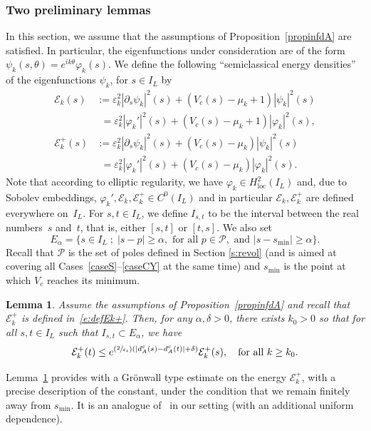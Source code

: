 \documentclass[JEP,XML,SOM,Unicode]{cedram}
\newcommand{\Psfrac}[2]{(\sfrac{#1}{#2})}
\newcommand{\sep}{\;;\;}
\newtheorem{lemma}{Lemma}[section]
\theoremstyle{definition}
\newcommand{\Ek}{\mathcal{E}_k}
\newcommand{\loc}{\mathrm{loc}}
\newcommand{\ce}{c}
\let\d\partial
\let\e\varepsilon
\let\eps\varepsilon
\begin{document}
\subsubsection{Two preliminary lemmas}
In this section, we assume that the assumptions of Proposition~\ref{propinfdA} are satisfied. In particular, the eigenfunctions under consideration are of the form $\psi_k(s, \theta) = e^{ik \theta}\varphi_k(s)$.
We define the following ``semiclassical energy densities'' of the eigenfunctions $\psi_k$, for $s \in I_L$ by
\begin{align}
\label{e:defEk}\Ek(s)&:= \eps_k^2 |\d_s \psi_k|^2(s)+ (V_\ce(s) -\mu_k+1)|\psi_k|^2(s) \\
& \phantom{:}= \eps_k^2 |\varphi_k'|^2(s)+ (V_\ce(s) -\mu_k+1)|\varphi_k|^2(s),\nonumber \\
\label{e:defEk+} \Ek^+(s)&:=\eps_k^2 |\d_s \psi_k|^2(s)+(V_\ce(s) -\mu_k)|\psi_k|^2(s) \\
& \phantom{:}=\eps_k^2 |\varphi_k'|^2(s)+(V_\ce(s) -\mu_k)|\varphi_k|^2(s). \nonumber
\end{align}
Note that according to elliptic regularity, we have $\varphi_k \in H^2_{\loc}(I_L)$ and, due to Sobolev embeddings, $\varphi_k', \Ek, \Ek^+ \in C^0(I_L)$ and in particular $\Ek, \Ek^+$ are defined everywhere on~$I_L$.
For $s, t \in I_L$, we define $I_{s,t}$ to be the interval between the real numbers~$s$ and~$t$, that is, either $[s,t]$ or $[t,s]$.
We also set
\begin{equation}
\label{e:def-E-alpha}
E_\alpha = \{ s \in I_L \sep |s-p| \geq \alpha, \text{ for all } p\in\mathcal{P}, \text{ and }|s-s_{\min}|\geq \alpha \}.
\end{equation}
Recall that $\mathcal{P}$ is the set of poles defined in Section \ref{s:revol} (and is aimed at covering all Cases~\ref{caseS}--\ref{caseCY}
at the same time) and $s_{\min}$ is the point at which $V_{\ce}$ reaches its minimum.
\begin{lemma}
\label{GronwallAgmon}
Assume the assumptions of Proposition~\ref{propinfdA} and recall that $\Ek^+$ is defined in~\eqref{e:defEk+}.
Then, for any $\alpha,\delta>0$, there exists $k_0>0$ so that for all $s,t \in I_L$ such that $I_{s,t} \subset E_\alpha$, we have
\[
\Ek^+(t)\leq e^{\Psfrac{2}{\e_k}\left(|d_A^{\ce}(s)-d_A^{\ce}(t)|+\delta\right)}\Ek^+(s), \quad \text{for all }k\geq k_0.
\]
\end{lemma}
Lemma~\ref{GronwallAgmon} provides with a Grönwall type estimate on the energy $\Ek^+$, with a precise description of the constant, under the condition that we remain finitely away from $s_{\min}$. It is an analogue of~\cite[Lem.\,12]{Allibert:98} in our setting (with an additional uniform dependence).
\end{document}
